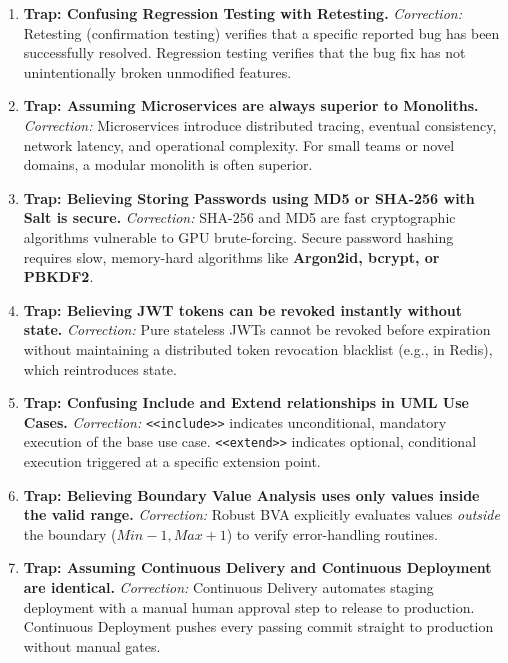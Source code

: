 \begin{enumerate}[label=\arabic*.,leftmargin=2em]
    \item \textbf{Trap: Confusing Regression Testing with Retesting.}
    \textit{Correction:} Retesting (confirmation testing) verifies that a specific reported bug has been successfully resolved. Regression testing verifies that the bug fix has not unintentionally broken unmodified features.

    \item \textbf{Trap: Assuming Microservices are always superior to Monoliths.}
    \textit{Correction:} Microservices introduce distributed tracing, eventual consistency, network latency, and operational complexity. For small teams or novel domains, a modular monolith is often superior.

    \item \textbf{Trap: Believing Storing Passwords using MD5 or SHA-256 with Salt is secure.}
    \textit{Correction:} SHA-256 and MD5 are fast cryptographic algorithms vulnerable to GPU brute-forcing. Secure password hashing requires slow, memory-hard algorithms like \textbf{Argon2id, bcrypt, or PBKDF2}.

    \item \textbf{Trap: Believing JWT tokens can be revoked instantly without state.}
    \textit{Correction:} Pure stateless JWTs cannot be revoked before expiration without maintaining a distributed token revocation blacklist (e.g., in Redis), which reintroduces state.

    \item \textbf{Trap: Confusing Include and Extend relationships in UML Use Cases.}
    \textit{Correction:} \lstinline|<<include>>| indicates unconditional, mandatory execution of the base use case. \lstinline|<<extend>>| indicates optional, conditional execution triggered at a specific extension point.

    \item \textbf{Trap: Believing Boundary Value Analysis uses only values inside the valid range.}
    \textit{Correction:} Robust BVA explicitly evaluates values \textit{outside} the boundary ($Min-1, Max+1$) to verify error-handling routines.

    \item \textbf{Trap: Assuming Continuous Delivery and Continuous Deployment are identical.}
    \textit{Correction:} Continuous Delivery automates staging deployment with a manual human approval step to release to production. Continuous Deployment pushes every passing commit straight to production without manual gates.


\end{enumerate}

